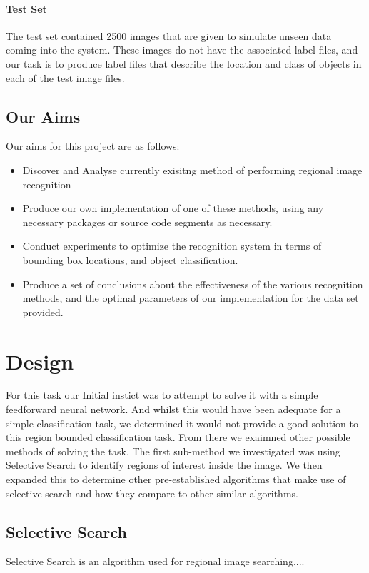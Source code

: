 \documentclass[10pt]{article}
\begin{document}
\paragraph{Test Set}
The test set contained 2500 images that are given to simulate unseen data coming into the system. These images do not have the associated label files, and our task is to produce label files that describe the location and class of objects in each of the test image files.

\subsection{Our Aims}
Our aims for this project are as follows:
\begin{itemize}
	\item Discover and Analyse currently exisitng method of performing regional image recognition
	\item Produce our own implementation of one of these methods, using any necessary packages or source code segments as necessary.
	\item Conduct experiments to optimize the recognition system in terms of bounding box locations, and object classification.
	\item Produce a set of conclusions about the effectiveness of the various recognition methods, and the optimal parameters of our implementation for the data set provided.
\end {itemize}

\section{Design}
For this task our Initial instict was to attempt to solve it with a simple feedforward neural network. And whilst this would have been adequate for a simple classification task, we determined it would not provide a good solution to this region bounded classification task. From there we exaimned other possible methods of solving the task. The first sub-method we investigated was using Selective Search to identify regions of interest inside the image. We then expanded this to determine other pre-established algorithms that make use of selective search and how they compare to other similar algorithms.

\subsection{Selective Search}
Selective Search is an algorithm used for regional image searching....
	
\end{document}
